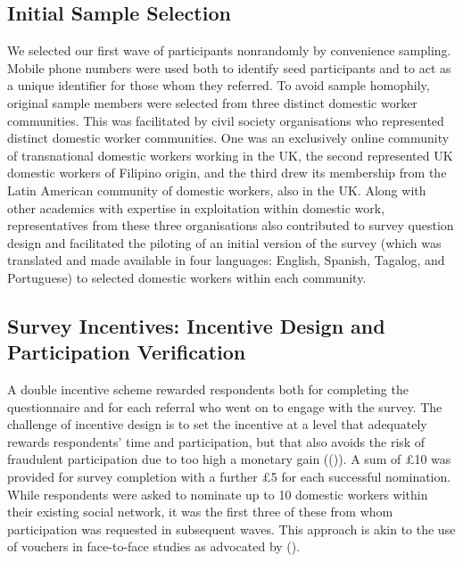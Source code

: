 \documentclass[
  12pt,
]{article}
\theoremstyle{plain}
\theoremstyle{definition}
\begin{document}
\subsection{Initial Sample Selection}\label{initial-sample-selection}

We selected our first wave of participants nonrandomly by convenience
sampling. Mobile phone numbers were used both to identify seed
participants and to act as a unique identifier for those whom they
referred. To avoid sample homophily, original sample members were
selected from three distinct domestic worker communities. This was
facilitated by civil society organisations who represented distinct
domestic worker communities. One was an exclusively online community of
transnational domestic workers working in the UK, the second represented
UK domestic workers of Filipino origin, and the third drew its
membership from the Latin American community of domestic workers, also
in the UK. Along with other academics with expertise in exploitation
within domestic work, representatives from these three organisations
also contributed to survey question design and facilitated the piloting
of an initial version of the survey (which was translated and made
available in four languages: English, Spanish, Tagalog, and Portuguese)
to selected domestic workers within each community.

\subsection{Survey Incentives: Incentive Design and Participation
Verification}\label{survey-incentives-incentive-design-and-participation-verification}

A double incentive scheme rewarded respondents both for completing the
questionnaire and for each referral who went on to engage with the
survey. The challenge of incentive design is to set the incentive at a
level that adequately rewards respondents' time and participation, but
that also avoids the risk of fraudulent participation due to too high a
monetary gain
(()).
A sum of £10 was provided for survey completion with a further £5 for
each successful nomination. While respondents were asked to nominate up
to 10 domestic workers within their existing social network, it was the
first three of these from whom participation was requested in subsequent
waves. This approach is akin to the use of vouchers in face-to-face
studies as advocated by
().
\end{document}
